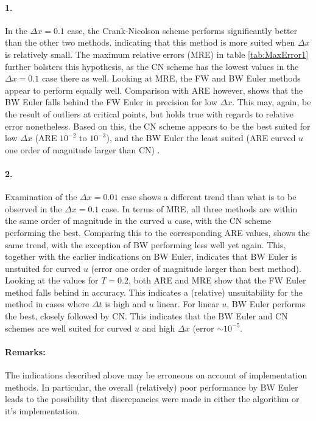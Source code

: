 \documentclass[%
oneside,                 %
final,                   %
10pt]{article}
\begin{document}
\paragraph{1.}
In the $\Delta x=0.1$ case, the Crank-Nicolson scheme performs significantly better than the other two methods. indicating that this method is more suited when $\Delta x$ is relatively small. The maximum relative errors (MRE) in table \ref{tab:MaxError1} further bolsters this hypothesis, as the CN scheme has the lowest values in the $\Delta x=0.1$ case there as well. Looking at MRE, the FW and BW Euler methods appear to perform equally well. Comparison with ARE however, shows that the BW Euler falls behind the FW Euler in precision for low $\Delta x$. This may, again, be the result of outliers at critical points, but holds true with regards to relative error nonetheless. Based on this, the CN scheme appears to be the best suited for low $\Delta x$ (ARE $10^{-2}$ to $10^{-3}$), and the BW Euler the least suited (ARE curved $u$ one order of magnitude larger than CN) . 
\paragraph{2.}
Examination of the $\Delta x=0.01$ case shows a different trend than what is to be observed in the $\Delta x=0.1$ case. In terms of MRE, all three methods are within the same order of magnitude in the curved $u$ case, with the CN scheme performing the best. Comparing this to the corresponding ARE values, shows the same trend, with the exception of BW performing less well yet again. This, together with the earlier indications on BW Euler, indicates that BW Euler is unstuited for curved $u$ (error one order of magnitude larger than best method). Looking at the values for $T=0.2$, both ARE and MRE show that the FW Euler method falls behind in accuracy. This indicates a (relative) unsuitability for the method in cases where $\Delta t$ is high and $u$ linear. For linear $u$, BW Euler performs the best, closely followed by CN. This indicates that the BW Euler and CN schemes are well suited for curved $u$ and high $\Delta x$ (error $\sim 10^{-5}$. \newline
\paragraph{Remarks:}
The indications described above may be erroneous on account of implementation methods. In particular, the overall (relatively) poor performance by BW Euler leads to the possibility that discrepancies were made in either the algorithm or it's implementation.\newline
\end{document}
